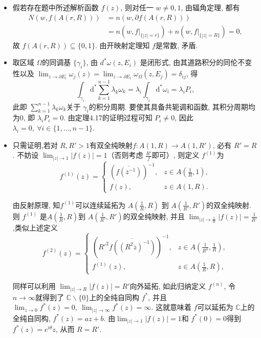  \begin{itemize}
    \item[4.4.1]

 假若存在题中所述解析函数 $f(z)$, 则对任一 $w  \not = 0,1 $, 
 由辐角定理, 都有 \begin{align*}N(w, f(A(r,R)))&=n(w, \partial f(A(r,R))) \\
 &= n(w, f|_{\{|z| = r\}})+ n(w, f|_{\{|z| = R\}}) = 0,\end{align*} 
 故 $f(A(r,R))\subseteq \{0,1\}$. 由开映射定理知 $f$是常数, 矛盾.

    \item[4.4.2]

 取区域 $\Omega$的同调基 $\{\gamma_i\}$, 由 $d^*\omega(z,E_i)$ 是闭形式, 
 由其道路积分的同伦不变性以及  $\lim_{z \to \partial E_i} \omega_j(z) 
 =\lim_{z \to \partial E_i} \omega_{\Omega}(z,E_{j}) = \delta_{ij} $, 得
 $$\int_{\gamma_{i}}\mathrm{d}^*\sum_{k=1}^{n-1}\lambda_k\omega_k 
 = \lambda_i\int_{\gamma_{i}}\mathrm{d}^*\omega_i = \lambda_i P_{i},$$
 此即  $\sum_{k=1}^{n-1}\lambda_k\omega_k$关于  $\gamma_i$的积分周期. 
 要使其具备共轭调和函数,  其积分周期均为$0$, 即 $\lambda_i P_{i} = 0$. 
 由定理4.17的证明过程可知 $P_i \not=0$, 因此  
 $\lambda_i=0,\ \forall i \in \{1, \ldots ,n-1\}$.

    \item[4.4.3]

 只需证明,若对  $R,R'>1$有双全纯映射$f: A(1,R) \to A(1,R')$, 必有  $R' = R$. 
 不妨设 $\lim_{|z| \to 1}|f(z)| = 1$（否则考虑 $\frac{R'}{f}$即可）, 
 则定义 $f^{(1)}$为
 $$f^{(1)}(z) = \begin{cases} (\overline{f(\overline{z}^{-1})})^{-1},  & z \in A(\frac{1}{R},1), \\ 
    f(z),&  z \in A(1,R).\end{cases}$$
 
 由反射原理, 知$f^{(1)}$可以连续延拓为 $A(\frac{1}{R},R)$
 到 $A(\frac{1}{R'},R')$的双全纯映射. 
 则 $f^{(1)}$ 是$A(\frac{1}{R},R)$到 $A(\frac{1}{R'},R')$的双全纯映射, 
 并且 $\lim_{|z| \to \frac{1}{R}}|f(z)| = \frac{1}{R'}$,类似上述定义
 $$f^{(2)}(z) = \begin{cases}  (R'^2\overline{f((R^2\overline{z})^{-1})})^{-1},  & z \in A(\frac{1}{R^3},\frac{1}{R}), \\ 
    f^{(1)}(z),&  z \in A(\frac{1}{R},R),\end{cases}$$

 同样可以利用  $\lim_{|z| \to R}|f(z)| =R'$向外延拓, 如此归纳定义 $f^{(n)}$,
 令  $n\to \infty$就得到了 $\mathbb{C}\backslash\{0\}$上的全纯自同构 $f^*$, 
 并且 $\lim_{z \to 0} f^{*}(z) = 0,\ \lim_{|z| \to \infty}f^{*}(z) = \infty$. 
 这就意味着 $f$可以延拓为  $\mathbb{C}$上的全纯自同构,  $f^*(z)  = az +b$. 
 由$\lim_{|z| \to 1}|f(z)| = 1$和  $f^*(0) = 0$得到  $f^{*}(z) = e^{i\theta}z$, 
 从而 $R = R'$.
\end{itemize} 

